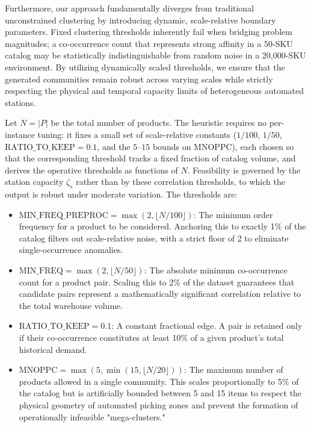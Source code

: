 \documentclass[preprint,review,11pt,authoryear]{elsarticle}
\begin{document}
Furthermore, our approach fundamentally diverges from traditional unconstrained clustering by introducing dynamic, scale-relative boundary parameters. Fixed clustering thresholds inherently fail when bridging problem magnitudes; a co-occurrence count that represents strong affinity in a 50-SKU catalog may be statistically indistinguishable from random noise in a 20,000-SKU environment. By utilizing dynamically scaled thresholds, we ensure that the generated communities remain robust across varying scales while strictly respecting the physical and temporal capacity limits of heterogeneous automated stations.

Let $N = |P|$ be the total number of products. The heuristic requires no per-instance tuning: it fixes a small set of scale-relative constants ($1/100$, $1/50$, $\mathrm{RATIO\_TO\_KEEP}=0.1$, and the $5$--$15$ bounds on $\mathrm{MNOPPC}$), each chosen so that the corresponding threshold tracks a fixed fraction of catalog volume, and derives the operative thresholds as functions of $N$. Feasibility is governed by the station capacity $\zeta_s$ rather than by these correlation thresholds, to which the output is robust under moderate variation. The thresholds are:



\begin{itemize}
    \item \(\mathrm{MIN\_FREQ\_PREPROC} = \max(2, \lfloor N / 100 \rfloor)\): The minimum order frequency for a product to be considered. Anchoring this to exactly 1\% of the catalog filters out scale-relative noise, with a strict floor of 2 to eliminate single-occurrence anomalies.
    \item \(\mathrm{MIN\_FREQ} = \max(2, \lfloor N / 50 \rfloor)\): The absolute minimum co-occurrence count for a product pair. Scaling this to 2\% of the dataset guarantees that candidate pairs represent a mathematically significant correlation relative to the total warehouse volume.
    \item \(\mathrm{RATIO\_TO\_KEEP} = 0.1\): A constant fractional edge. A pair is retained only if their co-occurrence constitutes at least 10\% of a given product's total historical demand.
    \item \(\mathrm{MNOPPC} = \max(5, \min(15, \lfloor N / 20 \rfloor))\): The maximum number of products allowed in a single community. This scales proportionally to 5\% of the catalog but is artificially bounded between 5 and 15 items to respect the physical geometry of automated picking zones and prevent the formation of operationally infeasible "mega-clusters."
\end{itemize}
\end{document}

